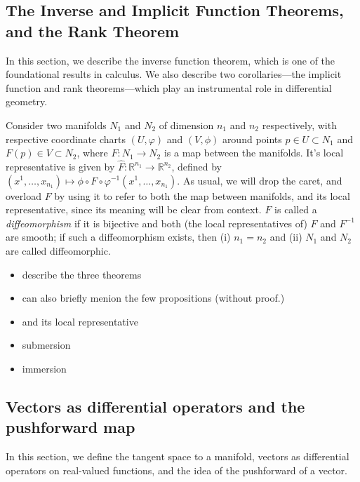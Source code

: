 \documentclass[psamsfonts]{amsart}
\theoremstyle{definition}
\theoremstyle{remark}
\newcommand*\R{\mathds{R}}
\numberwithin{equation}{section}
\begin{document}
\subsection{The Inverse and Implicit Function Theorems, and the Rank Theorem}
In this section, we describe the inverse function theorem, which is one of the foundational results in calculus. We also describe two corollaries---the implicit function and rank theorems---which play an instrumental role in differential geometry. 

Consider two manifolds $N_1$ and $N_2$ of dimension $n_1$ and $n_2$ respectively, with respective coordinate charts $(U, \varphi)$ and $(V, \phi)$ around points $p\in U\subset N_1$ and $F(p)\in V \subset N_2$, where $F:N_1 \rightarrow N_2$ is a map between the manifolds. It's local representative is given by $\hat F: \R^{n_1}\rightarrow \R^{n_2}$, defined by $(x^1, \dots, x_{n_1}) \mapsto \phi \circ F\circ \varphi^{-1}(x^1, \dots, x_{n_1})$. As usual, we will drop the caret, and overload $F$ by using it to refer to both the map between manifolds, and its local representative, since its meaning will be clear from context. $F$ is called a \textit{diffeomorphism} if it is bijective and both (the local representatives of) $F$ and $F^{-1}$ are smooth; if such a diffeomorphism exists, then (i) $n_1=n_2$ and (ii) $N_1$ and $N_2$ are called diffeomorphic. %

\begin{itemize}
\item describe the three theorems
\item can also briefly menion the few propositions (without proof.)
\item and its local representative 
\item submersion
\item immersion
\end{itemize}

\subsection{Vectors as differential operators and the pushforward map}
In this section, we define the tangent space to a manifold, vectors as differential operators on real-valued functions, and the idea of the pushforward of a vector. 
\end{document}
